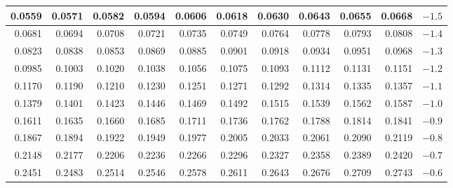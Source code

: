 \begin{table}[H]
\begin{center}
{\begin{tabular}{| rrrrr | rrrrr | c}
  \normalsize{0.0559} & \normalsize{0.0571} & \normalsize{0.0582} & \normalsize{0.0594} & \normalsize{0.0606} & \normalsize{0.0618} & \normalsize{0.0630} & \normalsize{0.0643} & \normalsize{0.0655} & \normalsize{0.0668} & $-1.5$ \\
    \hline
  \normalsize{0.0681} & \normalsize{0.0694} & \normalsize{0.0708} & \normalsize{0.0721} & \normalsize{0.0735} & \normalsize{0.0749} & \normalsize{0.0764} & \normalsize{0.0778} & \normalsize{0.0793} & \normalsize{0.0808} & $-1.4$ \\
  \normalsize{0.0823} & \normalsize{0.0838} & \normalsize{0.0853} & \normalsize{0.0869} & \normalsize{0.0885} & \normalsize{0.0901} & \normalsize{0.0918} & \normalsize{0.0934} & \normalsize{0.0951} & \normalsize{0.0968} & $-1.3$ \\
  \normalsize{0.0985} & \normalsize{0.1003} & \normalsize{0.1020} & \normalsize{0.1038} & \normalsize{0.1056} & \normalsize{0.1075} & \normalsize{0.1093} & \normalsize{0.1112} & \normalsize{0.1131} & \normalsize{0.1151} & $-1.2$ \\
  \normalsize{0.1170} & \normalsize{0.1190} & \normalsize{0.1210} & \normalsize{0.1230} & \normalsize{0.1251} & \normalsize{0.1271} & \normalsize{0.1292} & \normalsize{0.1314} & \normalsize{0.1335} & \normalsize{0.1357} & $-1.1$ \\
  \normalsize{0.1379} & \normalsize{0.1401} & \normalsize{0.1423} & \normalsize{0.1446} & \normalsize{0.1469} & \normalsize{0.1492} & \normalsize{0.1515} & \normalsize{0.1539} & \normalsize{0.1562} & \normalsize{0.1587} & $-1.0$ \\
    \hline
    \hline
  \normalsize{0.1611} & \normalsize{0.1635} & \normalsize{0.1660} & \normalsize{0.1685} & \normalsize{0.1711} & \normalsize{0.1736} & \normalsize{0.1762} & \normalsize{0.1788} & \normalsize{0.1814} & \normalsize{0.1841} & $-0.9$ \\
  \normalsize{0.1867} & \normalsize{0.1894} & \normalsize{0.1922} & \normalsize{0.1949} & \normalsize{0.1977} & \normalsize{0.2005} & \normalsize{0.2033} & \normalsize{0.2061} & \normalsize{0.2090} & \normalsize{0.2119} & $-0.8$ \\
  \normalsize{0.2148} & \normalsize{0.2177} & \normalsize{0.2206} & \normalsize{0.2236} & \normalsize{0.2266} & \normalsize{0.2296} & \normalsize{0.2327} & \normalsize{0.2358} & \normalsize{0.2389} & \normalsize{0.2420} & $-0.7$ \\
  \normalsize{0.2451} & \normalsize{0.2483} & \normalsize{0.2514} & \normalsize{0.2546} & \normalsize{0.2578} & \normalsize{0.2611} & \normalsize{0.2643} & \normalsize{0.2676} & \normalsize{0.2709} & \normalsize{0.2743} & $-0.6$ \\

\end{tabular}}
\end{center}
\end{table}
